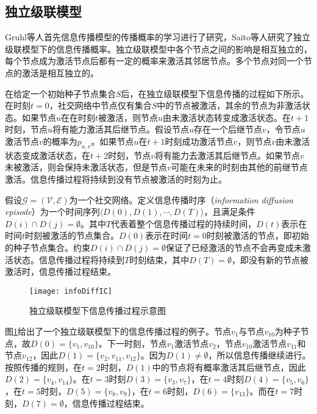 \subsection{独立级联模型}
\label{subsec5:icModel}
Gruhl等人首先信息传播模型的传播概率的学习进行了研究，Saito等人研究了独立级联模型下的信息传播概率。独立级联模型中各个节点之间的影响是相互独立的，每个节点成为激活节点后都有一定的概率来激活其邻居节点。多个节点对同一个节点的激活是相互独立的。

在给定一个初始种子节点集合$S$后，在独立级联模型下信息传播的过程如下所示。在时刻$t=0$，社交网络中节点仅有集合$S$中的节点被激活，其余的节点为非激活状态。如果节点$u$在在时刻$t$被激活，则节点$u$由未激活状态转变成激活状态。在$t+1$时刻，节点$u$将有能力激活其后继节点。假设节点$u$存在一个后继节点$v$，令节点$u$激活节点$v$的概率为$p_{u,v}$。如果节点$u$在$t+1$时刻成功激活节点$v$，则节点$v$由未激活状态变成激活状态，在$t+2$时刻，节点$v$将有能力去激活其后继节点。如果节点$v$未被激活，则会保持未激活状态，但是节点$v$可能在未来的时刻由其他的前继节点激活。信息传播过程将持续到没有节点被激活的时刻为止。

假设$\mathcal{G}=\left(\mathcal{V},\mathcal{E}\right)$为一个社交网络。定义信息传播时序（\textit{information diffusion episode}）为一个时间序列$\langle D\left(0\right), D\left(1\right), \cdots, D\left(T\right) \rangle$，且满足条件$D\left(i\right) \cap D\left(j\right) = \emptyset$。其中$T$代表着整个信息传播过程的持续时间，$D\left(t\right)$表示在时间$t$时刻被激活的节点集合。$D\left(0\right)$表示在时间$t=0$时刻被激活的节点，即初始的种子节点集合。约束$D\left(i\right) \cap D\left(j\right) = \emptyset$保证了已经激活的节点不会再变成未激活状态。信息传播过程将持续到$T$时刻结束，其中$D\left(T\right) = \emptyset$，即没有新的节点被激活时，信息传播过程结束。

\begin{figure}[!ht]
    \centering
    \texttt{[image: infoDiffIC]}
    \caption{独立级联模型下信息传播过程示意图}
    \label{fig:infoDiffIC}
\end{figure}

图\ref{fig:infoDiffIC}给出了一个独立级联模型下的信息传播过程的例子。节点$v_1$与节点$v_{10}$为种子节点，故$D\left(0\right)=\{v_1,v_{10}\}$。下一时刻，节点$v_1$激活节点$v_2$，节点$v_{10}$激活节点$v_{11}$和节点$v_{12}$，因此$D\left(1\right)=\{v_2,v_{11},v_{12}\}$。因为$D\left(1\right) \neq \emptyset$，所以信息传播继续进行。按照传播的规则，在$t=2$时刻，$D\left(1\right)$中的节点将有概率激活其后继节点，因此$D\left(2\right)=\{v_4,v_{14}\}$。在$t=3$时刻$D\left(3\right)=\{v_3,v_7\}$，在$t=4$时刻$D\left(4\right)=\{v_5,v_6\}$，在$t=5$时刻，$D\left(5\right)=\{v_8,v_9\}$，在$t=6$时刻，$D\left(6\right)=\{v_{13}\}$。而在$t=7$时刻，$D\left(7\right)=\emptyset$，信息传播过程结束。

